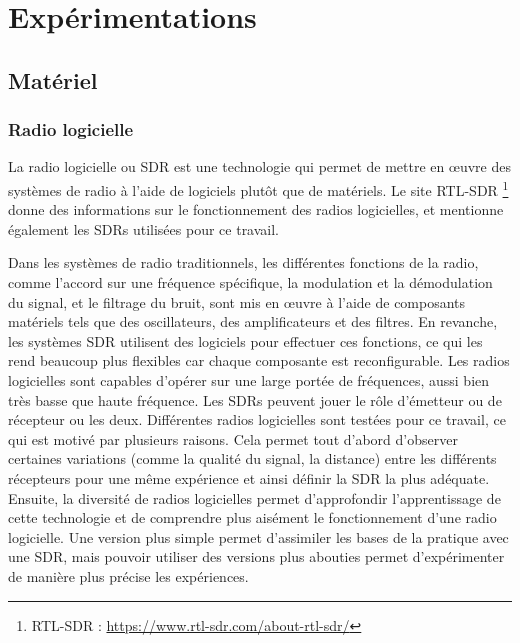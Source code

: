 \chapter{Expérimentations}


\renewcommand{\leftmark}{EXPERIMENTATIONS}

\section{Matériel}

\subsection{Radio logicielle}

La radio logicielle ou \ac{SDR} est une technologie qui permet de mettre en œuvre des systèmes de radio à l'aide de logiciels plutôt que de matériels. Le site RTL-SDR \footnote{RTL-SDR : \href{https://www.rtl-sdr.com/about-rtl-sdr/}{https://www.rtl-sdr.com/about-rtl-sdr/}} donne des informations sur le fonctionnement des radios logicielles, et mentionne également les SDRs utilisées pour ce travail.

\vspace{0.1cm}

Dans les systèmes de radio traditionnels, les différentes fonctions de la radio, comme l'accord sur une fréquence spécifique, la modulation et la démodulation du signal, et le filtrage du bruit, sont mis en œuvre à l'aide de composants matériels tels que des oscillateurs, des amplificateurs et des filtres. En revanche, les systèmes \ac{SDR} utilisent des logiciels pour effectuer ces fonctions, ce qui les rend beaucoup plus flexibles car chaque composante est reconfigurable. Les radios logicielles sont capables d'opérer sur une large portée de fréquences, aussi bien très basse que haute fréquence.
Les \ac{SDR}s peuvent jouer le rôle d'émetteur ou de récepteur ou les deux. Différentes radios logicielles sont testées pour ce travail, ce qui est motivé par plusieurs raisons. Cela permet tout d'abord d'observer certaines variations (comme la qualité du signal, la distance) entre les différents récepteurs pour une même expérience et ainsi définir la \ac{SDR} la plus adéquate. Ensuite, la diversité de radios logicielles permet d'approfondir l'apprentissage de cette technologie et de comprendre plus aisément le fonctionnement d'une radio logicielle. Une version plus simple permet d'assimiler les bases de la pratique avec une \ac{SDR}, mais pouvoir utiliser des versions plus abouties permet d'expérimenter de manière plus précise les expériences.

